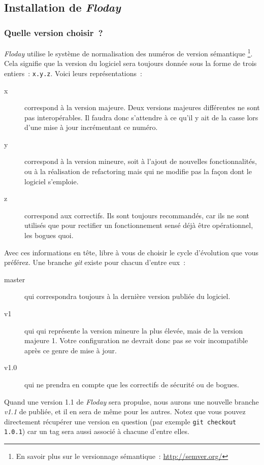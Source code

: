 \subsection{Installation de \emph{Floday}}

\subsubsection{Quelle version choisir~?}

\emph{Floday} utilise le système de normalisation des numéros de version sémantique%
\footnote{En savoir plus sur le versionnage sémantique~: \url{http://semver.org/}}.
Cela signifie que la version du logiciel sera toujours donnée sous la forme de trois entiers~: {\tt{}x.y.z}.
Voici leurs représentations~:

\begin{description}
	\item[x] correspond à la version majeure. Deux versions majeures différentes ne sont pas interopérables.
Il faudra donc s'attendre à ce qu'il y ait de la casse lors d'une mise à jour incrémentant ce numéro.
	\item[y] correspond à la version mineure, soit à l'ajout de nouvelles fonctionnalités, ou à la réalisation de refactoring mais qui ne modifie pas la façon dont le logiciel s'emploie.
	\item[z] correspond aux correctifs. Ils sont toujours recommandés, car ils ne sont utilisés que pour rectifier un fonctionnement sensé déjà être opérationnel, les bogues quoi.
\end{description}

Avec ces informations en tête, libre à vous de choisir le cycle d'évolution que vous préférez. Une branche \emph{git} existe pour chacun d'entre eux~:
\begin{description}
	\item[master] qui correspondra toujours à la dernière version publiée du logiciel.
	\item[v1] qui qui représente la version mineure la plus élevée, mais de la version majeure 1. Votre configuration ne devrait donc pas se voir incompatible après ce genre de mise à jour.
	\item[v1.0] qui ne prendra en compte que les correctifs de sécurité ou de bogues.
\end{description}

Quand une version 1.1 de \emph{Floday} sera \gls{propulse}, nous aurons une nouvelle branche \emph{v1.1} de publiée, et il en sera de même pour les autres.
Notez que vous pouvez directement récupérer une version en question (par exemple {\tt git checkout 1.0.1}) car un tag sera aussi associé à chacune d'entre elles.

